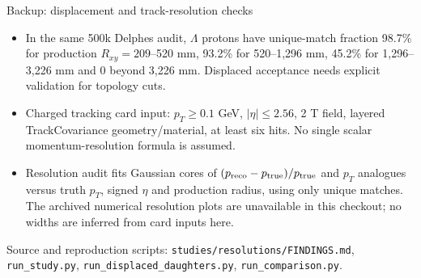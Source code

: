 \documentclass[aspectratio=169,10pt]{beamer}
\begin{document}
\begin{frame}{Backup: displacement and track-resolution checks}
\small\begin{itemize}
\item In the same 500k Delphes audit, $\Lambda$ protons have unique-match fraction 98.7\% for production $R_{xy}=209$--520 mm, 93.2\% for 520--1,296 mm, 45.2\% for 1,296--3,226 mm and 0 beyond 3,226 mm. Displaced acceptance needs explicit validation for topology cuts.
\item Charged tracking card input: $p_T\geq0.1$ GeV, $|\eta|\leq2.56$, 2 T field, layered TrackCovariance geometry/material, at least six hits. No single scalar momentum-resolution formula is assumed.
\item Resolution audit fits Gaussian cores of $(p_{\rm reco}-p_{\rm true})/p_{\rm true}$ and $p_T$ analogues versus truth $p_T$, signed $\eta$ and production radius, using only unique matches. The archived numerical resolution plots are unavailable in this checkout; no widths are inferred from card inputs here.
\end{itemize}
\scriptsize Source and reproduction scripts: \texttt{studies/resolutions/FINDINGS.md}, \texttt{run\_study.py}, \texttt{run\_displaced\_daughters.py}, \texttt{run\_comparison.py}.
\end{frame}
\end{document}
